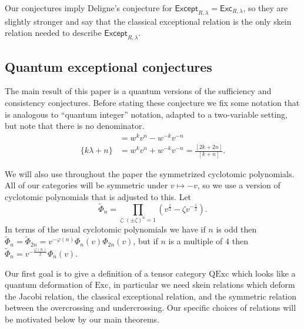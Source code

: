 \documentclass[12pt]{amsart}
\begin{document}
Our conjectures imply Deligne's conjecture for $\mathsf{Except}_{R,\lambda} = \mathsf{Exc}_{R,\lambda}$, so they are slightly stronger and say that the classical exceptional relation is the only skein relation needed to describe $\mathsf{Except}_{R,\lambda}$.

\subsection{Quantum exceptional conjectures}

The main result of this paper is a quantum versions of the sufficiency and consistency conjectures.  
Before stating these conjecture we fix some notation that is analogous to ``quantum
integer'' notation, adapted to a two-variable setting, but note that there is
no denominator.
\begin{align*}
[k\lambda + n] &= w^kv^n - w^{-k}v^{-n}\\
\{k\lambda + n\} &= w^k v^n + w^{-k} v^{-n} = \frac{[2k+2n]}{[k+n]}.
\end{align*}

We will also use throughout the paper the symmetrized cyclotomic polynomials.  All of our categories will be symmetric under $v \mapsto -v$, so we use a version of cyclotomic polynomials that is adjusted to this.  Let $$\widetilde{\Phi}_n = \prod_{\zeta: (\pm \zeta)^n = 1} (v^{\frac{1}{2}}-\zeta v^{-\frac{1}{2}}).$$  In terms of the usual cyclotomic polynomials we have if $n$ is odd then $\widetilde{\Phi}_n = \widetilde{\Phi}_{2n} = v^{-\varphi(n)} \Phi_n(v) \Phi_{2n}(v)$, but if $n$ is a multiple of $4$ then $\widetilde{\Phi}_n = v^{-\frac{\varphi(n)}{2}} \Phi_n(v)$.


Our first goal is to give a definition of a tensor category $\mathrm{QExc}$ which looks like a quantum deformation of $\mathrm{Exc}$, in particular we need skein relations which deform the Jacobi relation, the classical exceptional relation, and the symmetric relation between the overcrossing and undercrossing.  Our specific choices of relations will be motivated below by our main theorems. 
\end{document}

